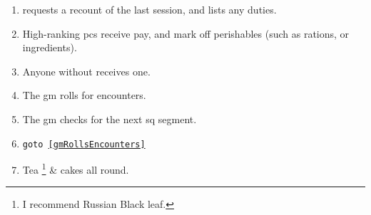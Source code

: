 
\begin{enumerate}
  \item
   requests a recount of the last session, and lists any duties.
  \item
  High-ranking \Glspl{pc} receive pay, and mark off perishables (such as rations, or \glspl{ingredient}).
  \item
  Anyone without  receives one.
  \label{newPC}
  \item
  The \gls{gm} rolls for encounters.
  \label{gmRollsEncounters}
  \item
  The \gls{gm} checks for the next \gls{sq} \gls{segment}.
  \item
  {\tt goto \ref{gmRollsEncounters}}
  \item
  Tea%
  \footnote{I recommend Russian Black leaf.}
  \& cakes all round.
\end{enumerate}
